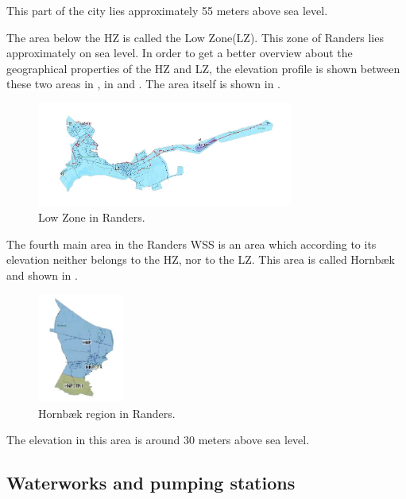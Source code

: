 This part of the city lies approximately 55 meters above sea level. 

The area below the HZ is called the Low Zone(LZ). This zone of Randers lies approximately on sea level. In order to get a better overview about the geographical properties of the HZ and LZ, the elevation profile is shown between these two areas in , in  and . The area itself is shown in .

\begin{figure}[H]
\centering
\includegraphics[width=0.75\textwidth]{report/pictures/Lowzone_region}
\caption{Low Zone in Randers.}
\label{fig:lowzone_region}
\end{figure}

The fourth main area in the Randers WSS is an area which according to its elevation neither belongs to the HZ, nor to the LZ. This area is called Hornbæk and shown in .

\begin{figure}[H]
\centering
\includegraphics[width=0.25\textwidth]{report/pictures/Hornbaek_region}
\caption{Hornbæk region in Randers.}
\label{fig:hornbaek_region}
\end{figure}

The elevation in this area is around 30 meters above sea level.  

\subsection{Waterworks and pumping stations}
\label{waterworks_and_pumping_stations}

